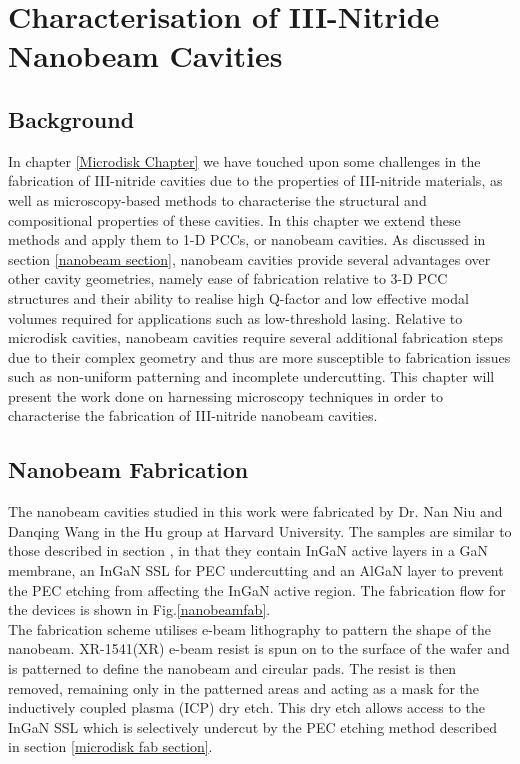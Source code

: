 
\chapter{Characterisation of III-Nitride Nanobeam Cavities}

\ifpdf
    \graphicspath{{Chapter2/Figs/Raster/}{Chapter2/Figs/PDF/}{Chapter2/Figs/}}
\else
    \graphicspath{{Chapter2/Figs/Vector/}{Chapter2/Figs/}}
\fi


\section[Background]{Background}
In chapter \ref{Microdisk Chapter} we have touched upon some challenges in the fabrication of III-nitride cavities due to the properties of III-nitride materials, as well as microscopy-based methods to characterise the structural and compositional properties of these cavities. In this chapter we extend these methods and apply them to 1-D PCCs, or nanobeam cavities. As discussed in section \ref{nanobeam section}, nanobeam cavities provide several advantages over other cavity geometries, namely ease of fabrication relative to 3-D PCC structures and their ability to realise high Q-factor and low effective modal volumes required for applications such as low-threshold lasing. Relative to microdisk cavities, nanobeam cavities require several additional fabrication steps due to their complex geometry and thus are more susceptible to fabrication issues such as non-uniform patterning and incomplete undercutting. This chapter will present the work done on harnessing microscopy techniques in order to characterise the fabrication of III-nitride nanobeam cavities.

\section{Nanobeam Fabrication}
\label{nbfab}
The nanobeam cavities studied in this work were fabricated by Dr. Nan Niu and Danqing Wang in the Hu group at Harvard University. The samples are similar to those described in section \label{microdisk samples}, in that they contain InGaN active layers in a GaN membrane, an InGaN SSL for PEC undercutting and an AlGaN layer to prevent the PEC etching from affecting the InGaN active region. The fabrication flow for the devices is shown in Fig.\ref{nanobeamfab}.\\
The fabrication scheme utilises e-beam lithography to pattern the shape of the nanobeam. XR-1541(XR) e-beam resist is spun on to the surface of the wafer and is patterned to define the nanobeam and circular pads. The resist is then removed, remaining only in the patterned areas and acting as a mask for the inductively coupled plasma (ICP) dry etch. This dry etch allows access to the InGaN SSL which is selectively undercut by the PEC etching method described in section \ref{microdisk fab section}.


